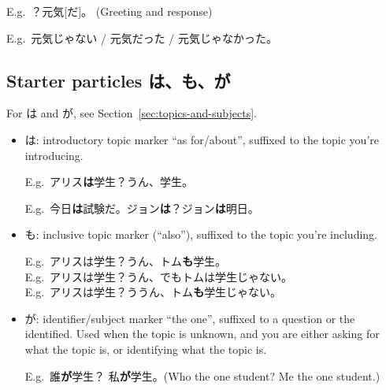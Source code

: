 \documentclass[../nihongo-gakushuu-kyouzai.tex]{subfiles}
\begin{document}
E.g.\ ？元気[だ]。 (Greeting and response)

E.g.\ 元気じゃない / 元気だった / 元気じゃなかった。

\subsection{Starter particles は、も、が} \label{sec:particles}
For は and が, see Section~\ref{sec:topics-and-subjects}.
\begin{itemize}
    \item は: introductory topic marker ``as for/about'', suffixed to the topic you're introducing.

    E.g.\ アリス\textbf{は}学生？うん、学生。

    E.g.\ 今日\textbf{は}試験だ。ジョン\textbf{は}？ジョン\textbf{は}明日。
    \item も: inclusive topic marker (``also''), suffixed to the topic you're including.

    E.g.\ アリスは学生？うん、トム\textbf{も}学生。\\
    E.g.\ アリスは学生？うん、でもトムは学生じゃない。\\
    E.g.\ アリスは学生？ううん、トム\textbf{も}学生じゃない。
    \item が: identifier/subject marker ``the one'', suffixed to a question or the identified. Used when the topic is unknown, and you are either asking for what the topic is, or identifying what the topic is.

    E.g.\ 誰\textbf{が}学生？ 私\textbf{が}学生。(Who the one student? Me the one student.)\\
\end{itemize}
\end{document}
